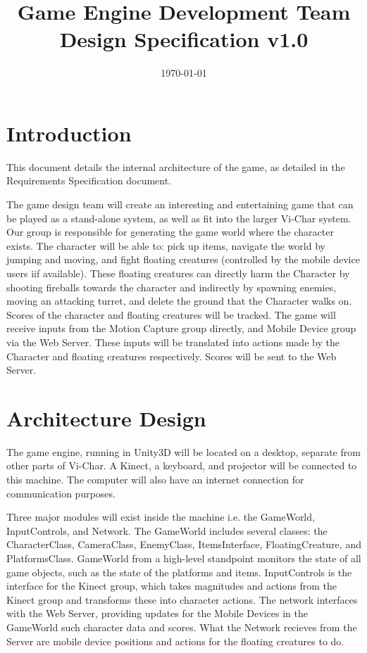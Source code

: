 \documentclass[10pt,letterpaper,oneside,english]{article}
\title{
	\textbf{Game Engine Development Team}\\
	Design Specification v1.0
}
\author{
	\person{Bahr}{Dan}{dbahr92@gmail.com}
	\and
	\person{Bard}{Etan}{ebard@ups.edu}
	\and
	\person{Burns}{Nick}{nbburns@ups.edu}
	\and
	\person{Livingston}{Chris}{christopherlivingston92@gmail.com}
	\and
	\person{Wilson}{Robin}{rkwilson@ups.edu}
}
\date{\today}
\begin{document}
\maketitle
\newpage

\tableofcontents
\newpage

\section{Introduction}
This document details the internal architecture of the game, as detailed in the  Requirements Specification document.

The game design team will create an interesting and entertaining game that can be played as a stand-alone system, as well as fit into the larger Vi-Char system. Our group is responsible for generating the game world where the character exists. The character will be able to: pick up items, navigate the world by jumping and moving, and fight floating creatures (controlled by the mobile device users iif available). These floating creatures can directly harm the Character by shooting fireballs towards the character and indirectly by spawning enemies, moving an attacking turret, and delete the ground that the Character walks on. Scores of the character and floating creatures will be tracked.
The game will receive inputs from the Motion Capture group directly, and Mobile Device group via the Web Server. These inputs will be translated into actions made by the Character and floating creatures respectively. Scores will be sent to the Web Server.

\section{Architecture Design} 
The game engine, running in Unity3D will be located on a desktop, separate from other parts of Vi-Char. A Kinect, a keyboard, and projector will be connected to this machine. The computer will also have an internet connection for communication purposes.

Three major modules will exist inside the machine i.e. the GameWorld, InputControls, and Network. The GameWorld includes several classes: the CharacterClass, CameraClass, EnemyClass, ItemsInterface, FloatingCreature, and PlatformsClass. GameWorld from a high-level standpoint monitors the state of all game objects, such as the state of the platforms and items. InputControls is the interface for the Kinect group, which takes magnitudes and actions from the Kinect group and transforms these into character actions. The network interfaces with the Web Server, providing updates for the Mobile Devices in the GameWorld such character data and scores. What the Network recieves from the Server are mobile device positions and actions for the floating creatures to do.
\end{document}
